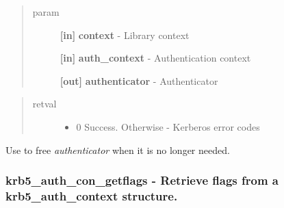 \documentclass[letterpaper,10pt,english]{sphinxmanual}
\begin{document}
\begin{fulllineitems}
\label{appdev/refs/api/krb5_auth_con_getauthenticator:krb5_auth_con_getauthenticator}
\end{fulllineitems}

\begin{quote}\begin{description}
\item[{param}] \leavevmode
\textbf{{[}in{]}} \textbf{context} - Library context

\textbf{{[}in{]}} \textbf{auth\_context} - Authentication context

\textbf{{[}out{]}} \textbf{authenticator} - Authenticator

\end{description}\end{quote}
\begin{quote}\begin{description}
\item[{retval}] \leavevmode\begin{itemize}
\item {} 
0   Success. Otherwise - Kerberos error codes

\end{itemize}

\end{description}\end{quote}

Use {\hyperref[appdev/refs/api/krb5_free_authenticator:krb5_free_authenticator]{}} to free \emph{authenticator} when it is no longer needed.


\subsubsection{krb5\_auth\_con\_getflags -  Retrieve flags from a krb5\_auth\_context structure.}
\label{appdev/refs/api/krb5_auth_con_getflags:krb5-auth-con-getflags-retrieve-flags-from-a-krb5-auth-context-structure}\label{appdev/refs/api/krb5_auth_con_getflags::doc}
\end{document}
